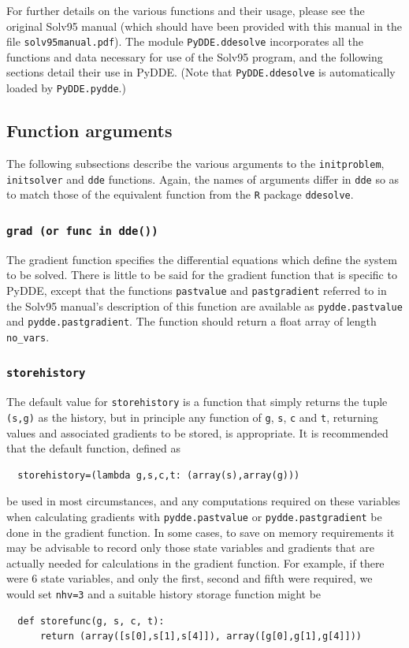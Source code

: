 \documentclass[10pt,a4paper] {article}
\begin{document}
For further details on the various functions and their usage, please see the original Solv95 manual (which should have been provided with this manual in the file \verb+solv95manual.pdf+).  The module \verb+PyDDE.ddesolve+ incorporates all the functions and data necessary for use of the Solv95 program, and the following sections detail their use in PyDDE.  (Note that \verb+PyDDE.ddesolve+ is automatically loaded by \verb+PyDDE.pydde+.)

\subsection{Function arguments}

The following subsections describe the various arguments to the \verb+initproblem+, \verb+initsolver+ and \verb+dde+ functions.  Again, the names of arguments differ in \verb+dde+ so as to match those of the equivalent function from the \verb+R+ package \verb+ddesolve+.

\subsubsection{\tt{grad} \textrm{(or} {\tt func}\textrm{ in} {\tt dde()}\textrm{)}}\label{S:grad}

The gradient function specifies the differential equations which define the system to be solved.  There is little to be said for the gradient function that is specific to PyDDE, except that the functions \verb+pastvalue+ and \verb+pastgradient+ referred to in the Solv95 manual's description of this function are available as \verb+pydde.pastvalue+ and \verb+pydde.pastgradient+.  The function should return a float array of length \verb+no_vars+.

\subsubsection{\tt{storehistory}} 

The default value for \verb+storehistory+ is a function that simply returns the tuple \verb+(s,g)+ as the history, but in principle any function of \verb+g+, \verb+s+, \verb+c+ and \verb+t+, returning values and associated gradients to be stored, is appropriate.  It is recommended that the default function, defined as
\begin{verbatim}
  storehistory=(lambda g,s,c,t: (array(s),array(g)))
\end{verbatim}
be used in most circumstances, and any computations required on these variables when calculating gradients with \verb+pydde.pastvalue+ or \verb+pydde.pastgradient+ be done in the gradient function.  In some cases, to save on memory requirements it may be advisable to record only those state variables and gradients that are actually needed for calculations in the gradient function.  For example, if there were $6$ state variables, and only the first, second and fifth were required, we would set \verb+nhv=3+ and a suitable history storage function might be
\begin{verbatim}
  def storefunc(g, s, c, t):
      return (array([s[0],s[1],s[4]]), array([g[0],g[1],g[4]]))
\end{verbatim}
\end{document}
